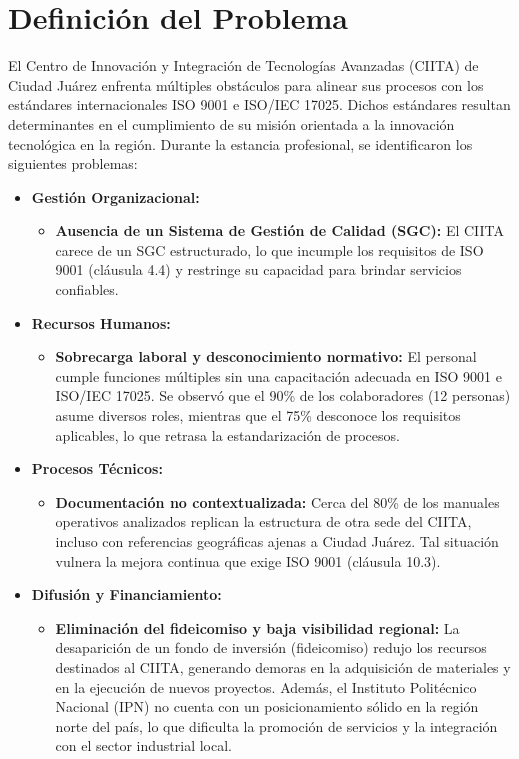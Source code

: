 \section{Definición del Problema}

El Centro de Innovación y Integración de Tecnologías Avanzadas (CIITA) de Ciudad Juárez enfrenta múltiples obstáculos para alinear sus procesos con los estándares internacionales ISO 9001 e ISO/IEC 17025. Dichos estándares resultan determinantes en el cumplimiento de su misión orientada a la innovación tecnológica en la región. Durante la estancia profesional, se identificaron los siguientes problemas:

\begin{itemize}
	\item \textbf{Gestión Organizacional:}
	\begin{itemize}
		\item \textbf{Ausencia de un Sistema de Gestión de Calidad (SGC):} El CIITA carece de un SGC estructurado, lo que incumple los requisitos de ISO 9001 (cláusula 4.4) y restringe su capacidad para brindar servicios confiables.
	\end{itemize}
	
	\item \textbf{Recursos Humanos:}
	\begin{itemize}
		\item \textbf{Sobrecarga laboral y desconocimiento normativo:} El personal cumple funciones múltiples sin una capacitación adecuada en ISO 9001 e ISO/IEC 17025. Se observó que el 90\% de los colaboradores (12 personas) asume diversos roles, mientras que el 75\% desconoce los requisitos aplicables, lo que retrasa la estandarización de procesos.
	\end{itemize}
	
	\item \textbf{Procesos Técnicos:}
	\begin{itemize}
		\item \textbf{Documentación no contextualizada:} Cerca del 80\% de los manuales operativos analizados replican la estructura de otra sede del CIITA, incluso con referencias geográficas ajenas a Ciudad Juárez. Tal situación vulnera la mejora continua que exige ISO 9001 (cláusula 10.3).
	\end{itemize}
	
	\item \textbf{Difusión y Financiamiento:}
	\begin{itemize}
		\item \textbf{Eliminación del fideicomiso y baja visibilidad regional:} La desaparición de un fondo de inversión (fideicomiso) redujo los recursos destinados al CIITA, generando demoras en la adquisición de materiales y en la ejecución de nuevos proyectos. Además, el Instituto Politécnico Nacional (IPN) no cuenta con un posicionamiento sólido en la región norte del país, lo que dificulta la promoción de servicios y la integración con el sector industrial local.
	\end{itemize}
\end{itemize}

